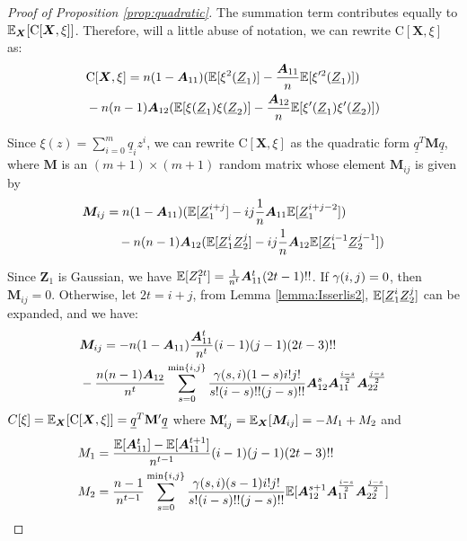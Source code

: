 \documentclass[appliedmath,article,accept,pdftex,moreauthors]{Definitions/mdpi}
\begin{document}
\begin{proof}[Proof of Proposition \ref{prop:quadratic}]
{The} summation term contributes equally to $\mathbb{E}_{\bm{X}}[\mathrm{C}[\bm{X}, \xi]]$. Therefore, will a little abuse of notation,
we can rewrite $\mathrm{C}[\bm{X}, \xi]$ as:
\begin{align*}
    &  \mathrm{C}[\bm{X}, \xi] =n(1-\bm{A}_{11})(\mathbb{E}[\xi^2(\underline{Z}_1)] -
    \frac{\bm{A}_{11}}{n}  \mathbb{E}[ \xi'^2(\underline{Z}_1)]) \\
    &- n(n-1)\bm{A}_{12}(\mathbb{E}[\xi(\underline{Z}_1)\xi(\underline{Z}_2)] -
    \frac{\bm{A}_{12}}{n}\mathbb{E}[\xi'(\underline{Z}_1)
   \xi'(\underline{Z}_2)])\nonumber
\end{align*}

Since 
$\xi(z) = \sum_{i=0}^m \underline{q}_i z^i $, we can rewrite $\mathrm{C}[\bm{X}, \xi]$
as the quadratic form $ \underline{q}^T \bm{M} \underline{q} ${,}
where $\bm{M}$ is an $(m+1) \times (m+1) $ random matrix 
whose element $\bm{M}_{ij}$ is given by
\begin{align*}
    \bm{M}_{ij} &= n(1-\bm{A}_{11}) (\mathbb{E}[\underline{Z}_1^{i+j}] -
    ij \frac{1}{n}\bm{A}_{11} \mathbb{E}[\underline{Z}_1^{i+j-2}])  \\
    &\quad -n(n-1)\bm{A}_{12}(\mathbb{E}[\underline{Z}_1^i \underline{Z}_2^j] - ij \frac{1}{n}\bm{A}_{12}\mathbb{E}[\underline{Z}_1^{i-1}\underline{Z}_2^{j-1}])
\end{align*}

{Since} $\bm{Z}_1$ is Gaussian, we have $\mathbb{E}[Z_1^{2t}] = \frac{1}{n^t}\bm{A}_{11}^t (2t-1)!!$. If $\gamma(i,j) = 0$, then $\bm{M}_{ij}=0$. Otherwise,
let $ 2t = i + j $, from Lemma \ref{lemma:Isserlis2}, $\mathbb{E}[\underline{Z}_1^i \underline{Z}_2^j]$ can be expanded, and we have:
\begin{align*}
    &\bm{M}_{ij} = -n(1-\bm{A}_{11}) \frac{\bm{A}_{11}^t}{n^t}(i-1)(j-1)(2t-3)!! \\
    &-\frac{n(n-1)\bm{A}_{12}}{n^t}\sum_{s=0}^{\min\{i,j\}}
    \frac{\gamma(s,i)(1-s)i!j!}{s!(i-s)!!(j-s)!!}
    \bm{A}_{12}^s \bm{A}_{11}^{\frac{i - s}{2}}\bm{A}_{22}^{\frac{j - s}{2}}
\end{align*}
$C[\xi] = \mathbb{E}_{\bm{X}}[\mathrm{C}[\bm{X}, \xi]] =  \underline{q}^T \mathbf{M}' \underline{q}$
where $\mathbf{M}'_{ij} = \mathbb{E}_{\bm{X}} [\bm{M}_{ij}] = -M_1 + M_2$
and 
\begin{align*}
    M_1 & =   \frac{\mathbb{E}[\bm{A}_{11}^t]-\mathbb{E}[\bm{A}_{11}^{t+1}]}{n^{t-1}}(i-1)(j-1)(2t-3)!! \\
    M_2 & = \frac{n-1}{n^{t-1}}\sum_{s=0}^{\min\{i,j\}}
    \frac{\gamma(s,i)(s-1)i!j!}{s!(i-s)!!(j-s)!!}
    \mathbb{E}[\bm{A}_{12}^{s+1} \bm{A}_{11}^{\frac{i - s}{2}}\bm{A}_{22}^{\frac{j - s}{2}}]
\end{align*}


\end{proof}
\end{document}
